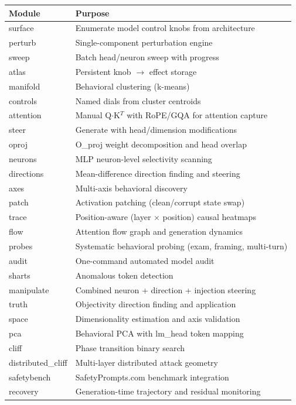 \documentclass[11pt,a4paper]{article}
\begin{document}
\begin{longtable}{ll}
\toprule
\textbf{Module} & \textbf{Purpose} \\
\midrule
\endhead
surface & Enumerate model control knobs from architecture \\
perturb & Single-component perturbation engine \\
sweep & Batch head/neuron sweep with progress \\
atlas & Persistent knob $\rightarrow$ effect storage \\
manifold & Behavioral clustering (k-means) \\
controls & Named dials from cluster centroids \\
attention & Manual Q$\cdot$K$^T$ with RoPE/GQA for attention capture \\
steer & Generate with head/dimension modifications \\
oproj & O\_proj weight decomposition and head overlap \\
neurons & MLP neuron-level selectivity scanning \\
directions & Mean-difference direction finding and steering \\
axes & Multi-axis behavioral discovery \\
patch & Activation patching (clean/corrupt state swap) \\
trace & Position-aware (layer $\times$ position) causal heatmaps \\
flow & Attention flow graph and generation dynamics \\
probes & Systematic behavioral probing (exam, framing, multi-turn) \\
audit & One-command automated model audit \\
sharts & Anomalous token detection \\
manipulate & Combined neuron + direction + injection steering \\
truth & Objectivity direction finding and application \\
space & Dimensionality estimation and axis validation \\
pca & Behavioral PCA with lm\_head token mapping \\
cliff & Phase transition binary search \\
distributed\_cliff & Multi-layer distributed attack geometry \\
safetybench & SafetyPrompts.com benchmark integration \\
recovery & Generation-time trajectory and residual monitoring \\
\bottomrule
\end{longtable}
\end{document}

